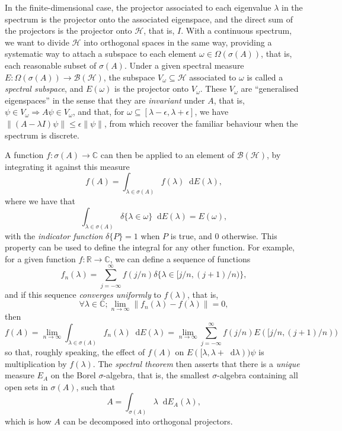 \documentclass[10pt, a4paper]{article}
\numberwithin{equation}{section} %
\theoremstyle{definition}
\theoremstyle{plain}
\newcommand{\norm}[1]{\left\lVert#1\right\rVert}
\newcommand{\dif}{\mathop{}\!\mathrm{d}} %
\newcommand{\?}{\mathrel{?}} %
\newcommand{\R}{\mathbb{R}} %
\newcommand{\C}{\mathbb{C}} %
\newcommand{\Hs}{\mathcal{H}} %
\begin{document}
\begin{appendices}
      In the finite-dimensional case, the projector associated to each eigenvalue \(\lambda\) in the spectrum is the projector onto the associated eigenspace, and the direct sum of the projectors is the projector onto \(\Hs\), that is, \(I\). With a continuous spectrum, we want to divide \(\Hs\) into orthogonal spaces in the same way, providing a systematic way to attach a subspace to each element \(\omega \in \Omega(\sigma(A))\), that is, each reasonable subset of \(\sigma(A)\). Under a given spectral measure \(E : \Omega(\sigma(A)) \to \mathcal{B}(\Hs)\), the subspace \(V_{\omega} \subseteq \Hs\) associated to \(\omega\) is called a \emph{spectral subspace}, and \(E(\omega)\) is the projector onto \(V_{\omega}\). These \(V_{\omega}\) are ``generalised eigenspaces'' in the sense that they are \emph{invariant} under \(A\), that is, \(\psi \in V_{\omega} \Rightarrow A\psi \in V_{\omega}\), and that, for \(\omega \subseteq [\lambda - \epsilon, \lambda + \epsilon]\), we have \(\norm{(A - \lambda I)\psi} \leq \epsilon\norm{\psi}\), from which recover the familiar behaviour when the spectrum is discrete.

      A function \(f : \sigma(A) \to \C\) can then be applied to an element of \(\mathcal{B}(\Hs)\), by integrating it against this measure
      \[ f(A) = \int_{\lambda \in \sigma(A)} f(\lambda) \dif{E(\lambda)}, \]
      where we have that
      \[ \int_{\lambda \in \sigma(A)} \delta\{\lambda \in \omega\} \dif{E(\lambda)} = E(\omega), \]
      with the \emph{indicator function} \(\delta\{P\} = 1\) when \(P\) is true, and 0 otherwise. This property can be used to define the integral for any other function. For example, for a given function \(f : \R \to \C\), we can define a sequence of functions
      \[ f_n(\lambda) = \sum_{j = -\infty}^{\infty} f(j/n) \delta\{\lambda \in [j/n, (j+1)/n)\}, \]
      and if this sequence \emph{converges uniformly} to \(f(\lambda)\), that is,
      \[ \forall \lambda \in \C; \lim_{n \to \infty} \norm{f_n(\lambda) - f(\lambda)} = 0, \]
      then
      \[ f(A) = \lim_{n\to\infty} \int_{\lambda \in \sigma(A)} f_n(\lambda) \dif{E(\lambda)} = \lim_{n\to\infty} \sum_{j = -\infty}^{\infty} f(j/n) E([j/n, (j+1)/n)) \]
      so that, roughly speaking, the effect of \(f(A)\) on \(E([\lambda, \lambda+\dif{\lambda}))\psi\) is multiplication by \(f(\lambda)\). The \emph{spectral theorem} then asserts that there is a \emph{unique} measure \(E_A\) on the Borel \(\sigma\)-algebra, that is, the smallest \(\sigma\)-algebra containing all open sets in \(\sigma(A)\), such that
      \[ A = \int_{\sigma(A)} \lambda \dif{E_A(\lambda)}, \]
      which is how \(A\) can be decomposed into orthogonal projectors.


\end{appendices}
\end{document}
